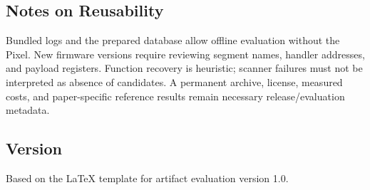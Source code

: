 \documentclass[nonacm,sigconf]{acmart}
\begin{document}
\subsection{Notes on Reusability}
Bundled logs and the prepared database allow offline evaluation without
the Pixel. New firmware versions require reviewing segment names,
handler addresses, and payload registers. Function recovery is heuristic;
scanner failures must not be interpreted as absence of candidates.
A permanent archive, license, measured costs, and paper-specific reference
results remain necessary release/evaluation metadata.

\subsection{Version}
Based on the LaTeX template for artifact evaluation version 1.0.







\end{document}
